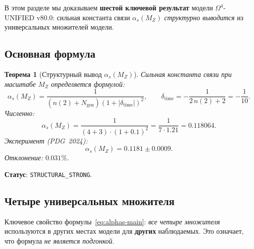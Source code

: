 \documentclass[11pt,a4paper]{article}
\newcommand{\Om}{\ensuremath{\Omega^4}}
\newcommand{\Ngen}{\ensuremath{N_{\text{gen}}}}
\newtheorem{theorem}{Теорема}[section]
\theoremstyle{definition}
\begin{document}
В этом разделе мы доказываем \textbf{шестой ключевой результат}
модели $\Om$-UNIFIED v80.0: сильная константа связи
$\alpha_s(M_Z)$ \emph{структурно выводится} из универсальных
множителей модели.

\subsection{Основная формула}
\label{subsec:alphas-formula}

\begin{theorem}[Структурный вывод $\alpha_s(M_Z)$]
\label{thm:alphas-structural}
Сильная константа связи при масштабе $M_Z$ определяется формулой:
\begin{equation}
    \boxed{
    \alpha_s(M_Z) = \frac{1}{(n(2) + \Ngen)(1 + |\delta_{\text{time}}|)^2},
    \qquad
    \delta_{\text{time}} = -\frac{1}{2\,n(2) + 2} = -\frac{1}{10}.
    }
    \label{eq:alphas-main}
\end{equation}
Численно:
\begin{equation}
    \alpha_s(M_Z) = \frac{1}{(4 + 3) \cdot (1 + 0.1)^2}
    = \frac{1}{7 \cdot 1.21} = 0.118064.
\end{equation}
Эксперимент (PDG~2024):
\begin{equation}
    \alpha_s(M_Z) = 0.1181 \pm 0.0009.
\end{equation}
Отклонение: $\mathbf{0.031\%}$.
\end{theorem}

\medskip\noindent
\textbf{Статус}: \texttt{STRUCTURAL\_STRONG}.

\subsection{Четыре универсальных множителя}
\label{subsec:alphas-audit}

Ключевое свойство формулы~\eqref{eq:alphas-main}:
\emph{все четыре множителя} используются в других местах модели
для \textbf{других} наблюдаемых. Это означает, что формула
\emph{не является подгонкой}.
\end{document}
